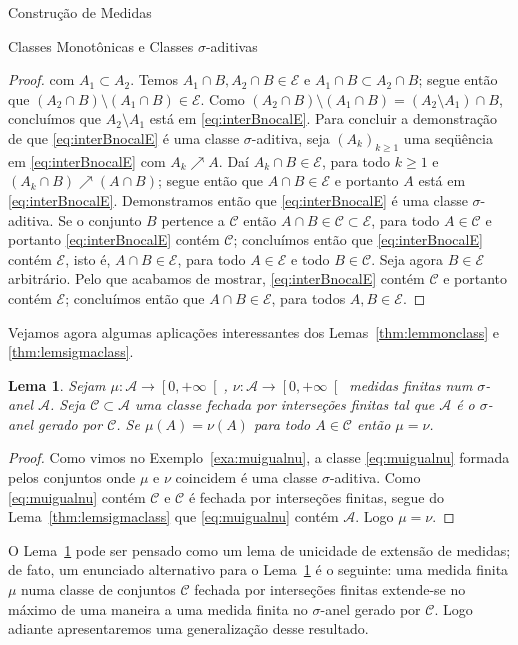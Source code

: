 \documentclass[oneside,final,11pt]{amsbook}
\theoremstyle{remark}\newtheorem{exercise}{Exercício}[chapter]
\theoremstyle{remark}\newtheorem{*exercise}[exercise]{\hbox to 0pt{\hskip 0pt minus 1fil*}Exercício}
\theoremstyle{definition}\newtheorem{exdefin}{Definição}[chapter]
\theoremstyle{plain}\newtheorem{teo}{Teorema}[section]
\theoremstyle{plain}\newtheorem{lem}[teo]{Lema}
\theoremstyle{plain}\newtheorem{prop}[teo]{Proposição}
\theoremstyle{plain}\newtheorem{cor}[teo]{Corolário}
\theoremstyle{definition}\newtheorem{defin}[teo]{Definição}
\theoremstyle{remark}\newtheorem{rem}[teo]{Observação}
\theoremstyle{definition}\newtheorem{notation}[teo]{Notação}
\theoremstyle{definition}\newtheorem{convention}[teo]{Convenção}
\theoremstyle{definition}\newtheorem{example}[teo]{Exemplo}
\numberwithin{section}{chapter}
\numberwithin{equation}{section}
\begin{document}
\begin{chapter}{Construção de Medidas}
\begin{section}{Classes Monotônicas e Classes ${\sigma}$-aditivas}
\begin{proof}
com $A_1\subset A_2$. Temos $A_1\cap B,A_2\cap B\in\mathcal E$ e $A_1\cap B\subset A_2\cap B$; segue então que
$(A_2\cap B)\setminus(A_1\cap B)\in\mathcal E$. Como $(A_2\cap B)\setminus(A_1\cap B)=(A_2\setminus A_1)\cap B$,
concluímos que $A_2\setminus A_1$ está em \eqref{eq:interBnocalE}. Para concluir a demonstração de que \eqref{eq:interBnocalE}
é uma classe $\sigma$-aditiva, seja $(A_k)_{k\ge1}$ uma seqüência em \eqref{eq:interBnocalE} com $A_k\nearrow A$.
Daí $A_k\cap B\in\mathcal E$, para todo $k\ge1$ e $(A_k\cap B)\nearrow(A\cap B)$; segue então que $A\cap B\in\mathcal E$
e portanto $A$ está em \eqref{eq:interBnocalE}. Demonstramos então que \eqref{eq:interBnocalE} é uma classe
$\sigma$-aditiva. Se o conjunto $B$ pertence a $\mathcal C$ então $A\cap B\in\mathcal C\subset\mathcal E$,
para todo $A\in\mathcal C$ e portanto \eqref{eq:interBnocalE} contém $\mathcal C$; concluímos então que
\eqref{eq:interBnocalE} contém $\mathcal E$, isto é, $A\cap B\in\mathcal E$, para todo $A\in\mathcal E$ e todo
$B\in\mathcal C$. Seja agora $B\in\mathcal E$ arbitrário. Pelo que acabamos de mostrar, \eqref{eq:interBnocalE}
contém $\mathcal C$ e portanto contém $\mathcal E$; concluímos então que $A\cap B\in\mathcal E$, para todos
$A,B\in\mathcal E$.
\end{proof}

Vejamos agora algumas aplicações interessantes dos Lemas~\ref{thm:lemmonclass}
e \ref{thm:lemsigmaclass}.
\begin{lem}\label{thm:uniqueext}
Sejam $\mu:\mathcal A\to\left[0,+\infty\right[$, $\nu:\mathcal A\to\left[0,+\infty\right[$
medidas finitas num $\sigma$-anel $\mathcal A$. Seja $\mathcal C\subset\mathcal A$
uma classe fechada por interseções finitas tal que $\mathcal A$ é o $\sigma$-anel
gerado por $\mathcal C$. Se $\mu(A)=\nu(A)$ para todo $A\in\mathcal C$ então $\mu=\nu$.
\end{lem}
\begin{proof}
Como vimos no Exemplo~\ref{exa:muigualnu}, a classe \eqref{eq:muigualnu} formada pelos conjuntos
onde $\mu$ e $\nu$ coincidem é uma classe $\sigma$-aditiva. Como \eqref{eq:muigualnu} contém
$\mathcal C$ e $\mathcal C$ é fechada por interseções finitas, segue do Lema~\ref{thm:lemsigmaclass}
que \eqref{eq:muigualnu} contém $\mathcal A$. Logo $\mu=\nu$.
\end{proof}
O Lema~\ref{thm:uniqueext} pode ser pensado como um lema de unicidade de extensão de medidas;
de fato, um enunciado alternativo para o Lema~\ref{thm:uniqueext} é o seguinte:
uma medida finita $\mu$ numa classe de conjuntos $\mathcal C$ fechada por interseções
finitas extende-se no máximo de uma maneira a uma medida finita no $\sigma$-anel gerado
por $\mathcal C$. Logo adiante apresentaremos uma generalização desse resultado.


\end{section}
\end{chapter}
\end{document}

